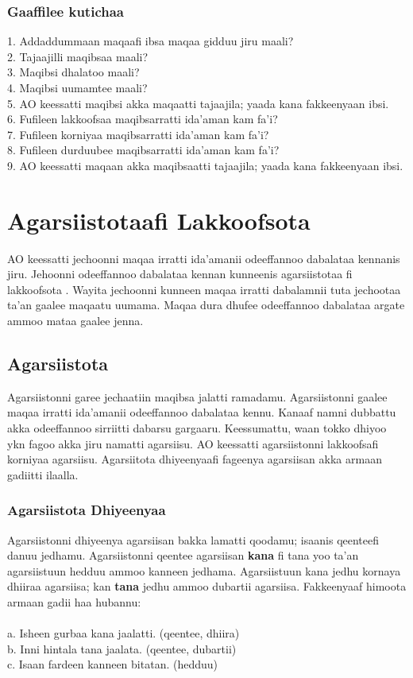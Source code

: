 \documentclass[11pt,b5paper]{book}
\begin{document}
\subsubsection{Gaaffilee kutichaa}

	1. Addaddummaan maqaafi ibsa maqaa gidduu jiru maali?\\
	2. Tajaajilli maqibsaa maali?\\
	3. Maqibsi dhalatoo maali?\\
	4. Maqibsi uumamtee maali?\\
	5. AO keessatti maqibsi akka maqaatti tajaajila; yaada kana
	fakkeenyaan ibsi.\\
	6. Fufileen lakkoofsaa maqibsarratti ida’aman kam fa’i?\\
	7. Fufileen korniyaa maqibsarratti ida’aman kam fa’i?\\
	8. Fufileen durduubee maqibsarratti ida’aman kam fa’i?\\
	9. AO keessatti maqaan akka maqibsaatti tajaajila; yaada
	kana fakkeenyaan ibsi. 

\newpage
\section{Agarsiistotaafi Lakkoofsota}

AO keessatti jechoonni maqaa irratti ida'amanii odeeffannoo
dabalataa kennanis jiru. Jehoonni odeeffannoo dabalataa kennan kunneenis agarsiistotaa fi lakkoofsota . Wayita
jechoonni kunneen maqaa irratti dabalamnii tuta jechootaa ta’an gaalee maqaatu uumama. Maqaa dura dhufee
odeeffannoo dabalataa argate ammoo mataa gaalee jenna. 

\subsection{Agarsiistota}
Agarsiistonni garee jechaatiin maqibsa jalatti ramadamu. Agarsiistonni gaalee maqaa irratti ida'amanii odeeffannoo
dabalataa kennu. Kanaaf namni dubbattu akka odeeffannoo sirriitti dabarsu gargaaru. Keessumattu, waan tokko dhiyoo
ykn fagoo akka jiru namatti agarsiisu. AO keessatti agarsiistonni lakkoofsafi korniyaa agarsiisu. Agarsiitota
dhiyeenyaafi fageenya agarsiisan akka armaan gadiitti ilaalla. 

\subsubsection{Agarsiistota Dhiyeenyaa}

Agarsiistonni dhiyeenya agarsiisan bakka lamatti qoodamu; isaanis qeenteefi danuu jedhamu. Agarsiistonni qeentee
agarsiisan \textbf{kana} fi tana yoo ta'an agarsiistuun hedduu ammoo kanneen jedhama. Agarsiistuun kana jedhu kornaya dhiiraa agarsiisa; kan \textbf{tana} jedhu ammoo dubartii agarsiisa. Fakkeenyaaf himoota armaan gadii haa hubannu: \\
\\
a. Isheen gurbaa kana jaalatti. (qeentee, dhiira)\\
b. Inni hintala tana jaalata. (qeentee, dubartii)\\
c. Isaan fardeen kanneen bitatan. (hedduu) \\
\end{document}
